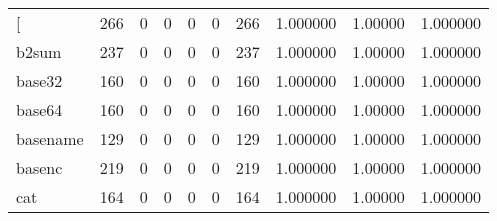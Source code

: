 \begin{longtable}{lrrrrrrrrr}
\bottomrule
\endlastfoot
{[}         &                    266 &                                  0 &                                 0 &                                0 &                                 0 &                             266 &                                1.000000 &                                1.00000 &                             1.000000 \\
b2sum     &                    237 &                                  0 &                                 0 &                                0 &                                 0 &                             237 &                                1.000000 &                                1.00000 &                             1.000000 \\
base32    &                    160 &                                  0 &                                 0 &                                0 &                                 0 &                             160 &                                1.000000 &                                1.00000 &                             1.000000 \\
base64    &                    160 &                                  0 &                                 0 &                                0 &                                 0 &                             160 &                                1.000000 &                                1.00000 &                             1.000000 \\
basename  &                    129 &                                  0 &                                 0 &                                0 &                                 0 &                             129 &                                1.000000 &                                1.00000 &                             1.000000 \\
basenc    &                    219 &                                  0 &                                 0 &                                0 &                                 0 &                             219 &                                1.000000 &                                1.00000 &                             1.000000 \\
cat       &                    164 &                                  0 &                                 0 &                                0 &                                 0 &                             164 &                                1.000000 &                                1.00000 &                             1.000000 \\

\end{longtable}
